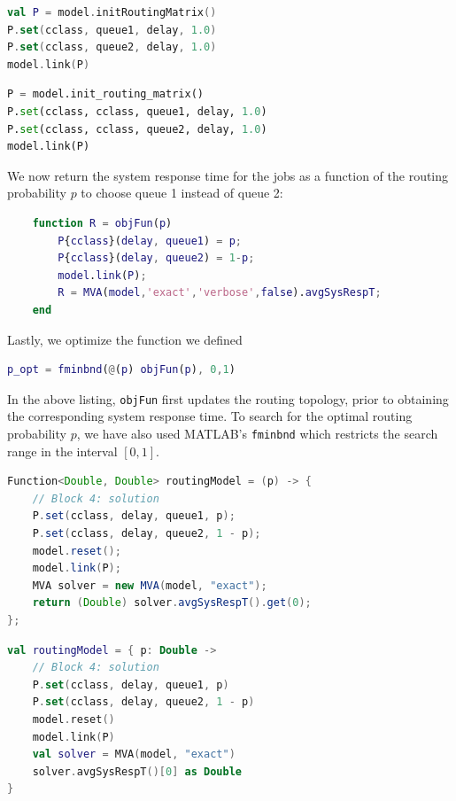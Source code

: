 \begin{KOTLIN}
\begin{lstlisting}[language = kotlin, basicstyle=\ttfamily\scriptsize]
val P = model.initRoutingMatrix()
P.set(cclass, queue1, delay, 1.0)
P.set(cclass, queue2, delay, 1.0)
model.link(P)
\end{lstlisting}
\end{KOTLIN}
\begin{PYTHON}
\begin{lstlisting}[language = python]
P = model.init_routing_matrix()
P.set(cclass, cclass, queue1, delay, 1.0)
P.set(cclass, cclass, queue2, delay, 1.0)
model.link(P)
\end{lstlisting}
\end{PYTHON}
We now return the system response time for the jobs as a function of the routing probability $p$ to choose queue 1 instead of queue 2:
\begin{MATLAB}
\begin{lstlisting}[language = matlab]
% Block 4: solution
    function R = objFun(p)
        P{cclass}(delay, queue1) = p;
        P{cclass}(delay, queue2) = 1-p;
        model.link(P);
        R = MVA(model,'exact','verbose',false).avgSysRespT;
    end
\end{lstlisting}
Lastly, we optimize the function we defined
\begin{lstlisting}[language = matlab]
p_opt = fminbnd(@(p) objFun(p), 0,1)
\end{lstlisting}
In the above listing, \texttt{objFun} first updates the routing topology, prior to obtaining the corresponding system response time. To search for the optimal routing probability $p$, we have also used MATLAB's \texttt{fminbnd} which restricts the search range in the interval $[0,1]$.
\end{MATLAB}
\begin{JAVA}
\begin{lstlisting}[language = java, basicstyle=\ttfamily\scriptsize]
Function<Double, Double> routingModel = (p) -> {
    // Block 4: solution
    P.set(cclass, delay, queue1, p);
    P.set(cclass, delay, queue2, 1 - p);
    model.reset();
    model.link(P);
    MVA solver = new MVA(model, "exact");
    return (Double) solver.avgSysRespT().get(0);
};
\end{lstlisting}
\end{JAVA}
\begin{KOTLIN}
\begin{lstlisting}[language = kotlin, basicstyle=\ttfamily\scriptsize]
val routingModel = { p: Double ->
    // Block 4: solution
    P.set(cclass, delay, queue1, p)
    P.set(cclass, delay, queue2, 1 - p)
    model.reset()
    model.link(P)
    val solver = MVA(model, "exact")
    solver.avgSysRespT()[0] as Double
}
\end{lstlisting}
\end{KOTLIN}
